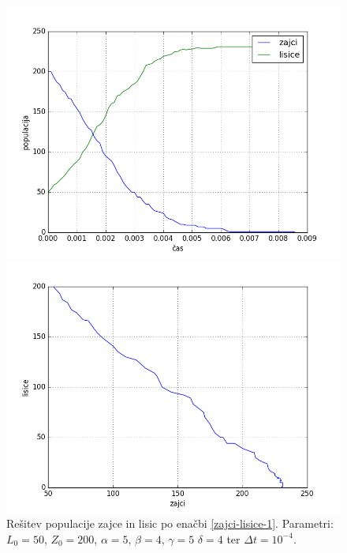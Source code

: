 \documentclass[slovene,11pt,a4paper]{article}
\numberwithin{equation}{section} %
\numberwithin{figure}{section} %
\numberwithin{table}{section} %
\begin{document}
\begin{figure}[h]
\centering
\begin{minipage}{0.5\textwidth}
\centering
\includegraphics[scale=0.45]{slike/zajci_lisice_populacija.png}
\end{minipage}\hfill
\begin{minipage}{0.5\textwidth}
\centering
\includegraphics[scale=0.45]{slike/zajcki_lisice_fazni.png}
\end{minipage}
\caption{Rešitev populacije zajce in lisic po enačbi \ref{zajci-lisice-1}. Parametri: $L_0=50$, $Z_0=200$, $\alpha=5$, $\beta=4$, $\gamma=5$ $\delta=4$ ter $\Delta t=10^{-4}$.}
\end{figure}
\end{document}
